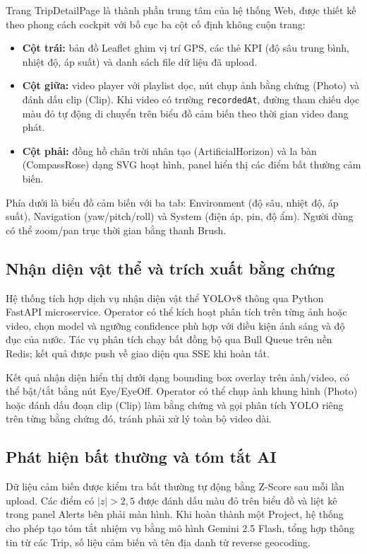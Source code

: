 \documentclass[../DoAn.tex]{subfiles}
\begin{document}
Trang TripDetailPage là thành phần trung tâm của hệ thống Web, được thiết kế theo phong cách cockpit với bố cục ba cột cố định không cuộn trang:

\begin{itemize}
    \item \textbf{Cột trái:} bản đồ Leaflet ghim vị trí GPS, các thẻ KPI (độ sâu trung bình, nhiệt độ, áp suất) và danh sách file dữ liệu đã upload.

    \item \textbf{Cột giữa:} video player với playlist dọc, nút chụp ảnh bằng chứng (Photo) và đánh dấu clip (Clip). Khi video có trường \texttt{recordedAt}, đường tham chiếu dọc màu đỏ tự động di chuyển trên biểu đồ cảm biến theo thời gian video đang phát.

    \item \textbf{Cột phải:} đồng hồ chân trời nhân tạo (ArtificialHorizon) và la bàn (CompassRose) dạng SVG hoạt hình, panel hiển thị các điểm bất thường cảm biến.
\end{itemize}

Phía dưới là biểu đồ cảm biến với ba tab: Environment (độ sâu, nhiệt độ, áp suất), Navigation (yaw/pitch/roll) và System (điện áp, pin, độ ẩm). Người dùng có thể zoom/pan trục thời gian bằng thanh Brush.

\subsection{Nhận diện vật thể và trích xuất bằng chứng}

Hệ thống tích hợp dịch vụ nhận diện vật thể YOLOv8 thông qua Python FastAPI microservice. Operator có thể kích hoạt phân tích trên từng ảnh hoặc video, chọn model và ngưỡng confidence phù hợp với điều kiện ánh sáng và độ đục của nước. Tác vụ phân tích chạy bất đồng bộ qua Bull Queue trên nền Redis; kết quả được push về giao diện qua SSE khi hoàn tất.

Kết quả nhận diện hiển thị dưới dạng bounding box overlay trên ảnh/video, có thể bật/tắt bằng nút Eye/EyeOff. Operator có thể chụp ảnh khung hình (Photo) hoặc đánh dấu đoạn clip (Clip) làm bằng chứng và gọi phân tích YOLO riêng trên từng bằng chứng đó, tránh phải xử lý toàn bộ video dài.

\subsection{Phát hiện bất thường và tóm tắt AI}

Dữ liệu cảm biến được kiểm tra bất thường tự động bằng Z-Score sau mỗi lần upload. Các điểm có $|z| > 2{,}5$ được đánh dấu màu đỏ trên biểu đồ và liệt kê trong panel Alerts bên phải màn hình. Khi hoàn thành một Project, hệ thống cho phép tạo tóm tắt nhiệm vụ bằng mô hình Gemini 2.5 Flash, tổng hợp thông tin từ các Trip, số liệu cảm biến và tên địa danh từ reverse geocoding.
\end{document}
